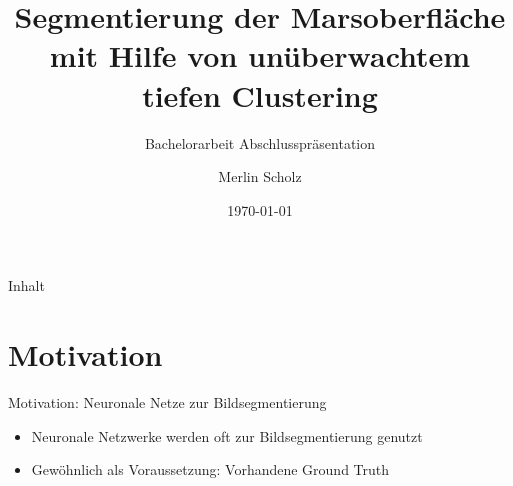 \documentclass{beamer}
\title{Segmentierung der Marsoberfläche mit Hilfe von unüberwachtem tiefen Clustering}
\subtitle{Bachelorarbeit Abschlusspräsentation}
\author{Merlin Scholz}
\date{\today}
\institute[TU Dortmund]{Mustererkennung,\\ Informatik XII, Technische Universität Dortmund}
\begin{document}
\maketitle

\begin{frame}{Inhalt}
\tableofcontents
\end{frame}


\section{Motivation}
\begin{frame}{Motivation: Neuronale Netze zur Bildsegmentierung}
\begin{itemize}
	\item Neuronale Netzwerke werden oft zur Bildsegmentierung genutzt
	\item Gewöhnlich als Voraussetzung: Vorhandene Ground Truth
\end{itemize}%
\end{frame}
\end{document}
